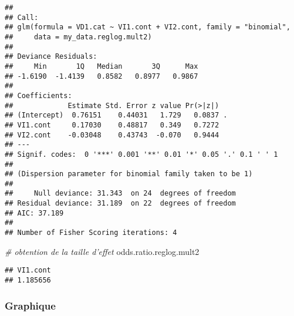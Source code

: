 \documentclass[
]{book}
\newenvironment{Shaded}{\begin{snugshade}}{\end{snugshade}}
\newcommand{\CommentTok}[1]{\textcolor[rgb]{0.56,0.35,0.01}{\textit{#1}}}
\newcommand{\NormalTok}[1]{#1}
\begin{document}
\begin{verbatim}
## 
## Call:
## glm(formula = VD1.cat ~ VI1.cont + VI2.cont, family = "binomial", 
##     data = my_data.reglog.mult2)
## 
## Deviance Residuals: 
##     Min       1Q   Median       3Q      Max  
## -1.6190  -1.4139   0.8582   0.8977   0.9867  
## 
## Coefficients:
##             Estimate Std. Error z value Pr(>|z|)  
## (Intercept)  0.76151    0.44031   1.729   0.0837 .
## VI1.cont     0.17030    0.48817   0.349   0.7272  
## VI2.cont    -0.03048    0.43743  -0.070   0.9444  
## ---
## Signif. codes:  0 '***' 0.001 '**' 0.01 '*' 0.05 '.' 0.1 ' ' 1
## 
## (Dispersion parameter for binomial family taken to be 1)
## 
##     Null deviance: 31.343  on 24  degrees of freedom
## Residual deviance: 31.189  on 22  degrees of freedom
## AIC: 37.189
## 
## Number of Fisher Scoring iterations: 4
\end{verbatim}

\begin{Shaded}
\begin{Highlighting}[]
\CommentTok{# obtention de la taille d'effet}
\NormalTok{odds.ratio.reglog.mult2}
\end{Highlighting}
\end{Shaded}

\begin{verbatim}
## VI1.cont 
## 1.185656
\end{verbatim}

\hypertarget{graphique-10}{%
\subsubsection{Graphique}\label{graphique-10}}
\end{document}
